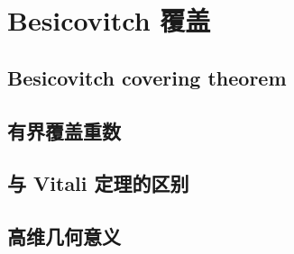 \section{Besicovitch 覆盖}
\label{b1:sec:1302}


\subsection{Besicovitch covering theorem}
\label{b1:subsec:130201}

\subsection{有界覆盖重数}
\label{b1:subsec:130202}

\subsection{与 Vitali 定理的区别}
\label{b1:subsec:130203}

\subsection{高维几何意义}
\label{b1:subsec:130204}



